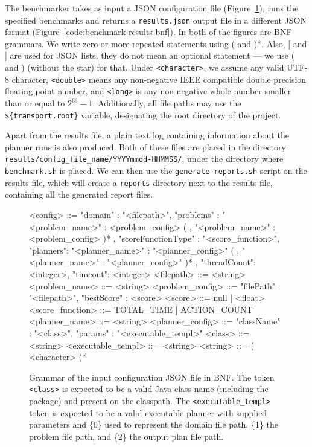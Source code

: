 The benchmarker takes as input a JSON \citep{Bray2014} configuration file (Figure~\ref{code:benchmark-config-bnf}),
runs the specified benchmarks and returns a \texttt{results.json} output file in a different JSON format (Figure~\ref{code:benchmark-results-bnf}).
In both of the figures are BNF grammars. We write zero-or-more repeated statements using ( and )*. Also, [ and ] are used for JSON lists, they do not mean an optional statement --- we use ( and ) (without the star) for that.
Under \texttt{<character>}, we assume any valid UTF-8 character,
\texttt{<double>} means any non-negative IEEE compatible double precision floating-point number,
and \texttt{<long>} is any non-negative whole number smaller than or equal to $2^{63}-1$.
Additionally, all file paths may use the \verb+${transport.root}+ variable, designating the
root directory of the project.

Apart from the results file, a plain text log containing information about the planner
runs is also produced. Both of these files are placed in the directory \texttt{results/config\_file\_name/YYYYmmdd-HHMMSS/}, under the directory where \texttt{benchmark.sh} is placed.
We can then use the \texttt{generate-reports.sh} script on the results file,
which will create a \texttt{reports} directory next to the results file,
containing all the generated report files.

\begin{figure}[tbp]
\centering
\begin{code}
<config> ::= { "domain" : "<filepath>",
               "problems" : { "<problem_name>" : <problem_config>
                          ( , "<problem_name>" : <problem_config> )* },
               "scoreFunctionType"  : "<score_function>",
               "planners": { "<planner_name>" : "<planner_config>"
                        ( , "<planner_name>" : "<planner_config>" )* },
               "threadCount": <integer>,
               "timeout": <integer> }
<filepath> ::= <string>
<problem_name> ::= <string>
<problem_config> ::= { "filePath" : "<filepath>",
                       "bestScore" : <score> }
<score> ::= null | <float>
<score_function> ::= TOTAL_TIME | ACTION_COUNT
<planner_name> ::= <string>
<planner_config> ::= { "className" : "<class>",
                       "params" : "<executable_templ>" }
<class> ::= <string>
<executable_templ> ::= <string>
<string> ::= ( <character> )*
\end{code}
\caption[Grammar of the input configuration JSON file in BNF.]{Grammar of the input configuration JSON file in BNF. The token \texttt{<class>}
is expected to be a valid Java class name (including the package) and present on the classpath.
The \texttt{<executable\_templ>} token is expected to be a valid executable planner with supplied parameters
and \{0\} used to represent the domain file path, \{1\} the problem file path, and \{2\} the output plan file path.}
\label{code:benchmark-config-bnf}
\end{figure}

